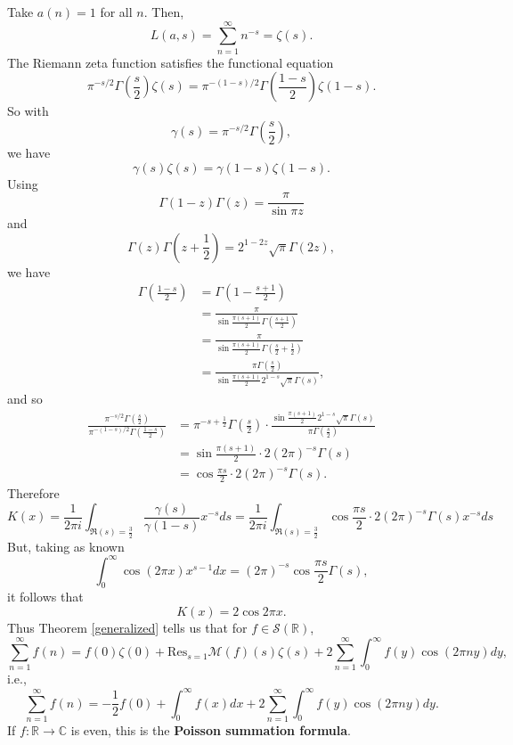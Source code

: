 \documentclass{article}
\newcommand{\Res}{\mathrm{Res}}
\theoremstyle{definition}
\begin{document}
Take $a(n)=1$ for all $n$. Then,
\[
L(a,s)=\sum_{n=1}^\infty n^{-s} = \zeta(s).
\]
The Riemann zeta function satisfies the functional equation
\[
\pi^{-s/2} \Gamma\left( \frac{s}{2} \right) \zeta(s)
=\pi^{-(1-s)/2} \Gamma\left( \frac{1-s}{2} \right) \zeta(1-s).
\]
So with
\[
\gamma(s) = \pi^{-s/2} \Gamma\left( \frac{s}{2} \right),
\]
we have
\[
\gamma(s) \zeta(s) = \gamma(1-s) \zeta(1-s).
\]
Using 
\[
\Gamma(1-z)\Gamma(z) = \frac{\pi}{\sin \pi z}
\]
and
\[
\Gamma(z)\Gamma\left(z+\frac{1}{2}\right) = 2^{1-2z} \sqrt{\pi} \Gamma(2z),
\]
we have
\begin{align*}
\Gamma\left(\frac{1-s}{2}\right)
&=\Gamma\left(1-\frac{s+1}{2}\right)\\
&=\frac{\pi}{\sin \frac{\pi(s+1)}{2} \Gamma\left(\frac{s+1}{2}\right)}\\
&=\frac{\pi}{\sin \frac{\pi(s+1)}{2} \Gamma\left(\frac{s}{2}+\frac{1}{2}\right)}\\
&=\frac{\pi \Gamma\left(\frac{s}{2}\right)}{\sin \frac{\pi(s+1)}{2} 2^{1-s}\sqrt{\pi} \Gamma(s)},
\end{align*}
and so
\begin{align*}
\frac{\pi^{-s/2} \Gamma\left( \frac{s}{2} \right)}{\pi^{-(1-s)/2} \Gamma\left( \frac{1-s}{2} \right)}&=
\pi^{-s+\frac{1}{2}} \Gamma\left( \frac{s}{2} \right) \cdot \frac{\sin \frac{\pi(s+1)}{2} 2^{1-s}\sqrt{\pi} \Gamma(s)}{\pi \Gamma\left(\frac{s}{2}\right)}\\
&=\sin \frac{\pi(s+1)}{2} \cdot 2 (2\pi)^{-s} \Gamma(s)\\
&=\cos \frac{\pi s}{2} \cdot 2 (2\pi)^{-s} \Gamma(s).
\end{align*}
Therefore
\[
K(x) = \frac{1}{2\pi i} \int_{\Re(s)=\frac{3}{2}} \frac{\gamma(s)}{\gamma(1-s)} x^{-s} ds
= \frac{1}{2\pi i} \int_{\Re(s)=\frac{3}{2}} \cos \frac{\pi s}{2} \cdot 2 (2\pi)^{-s} \Gamma(s) x^{-s} ds
\]
But, taking as known
\[
\int_0^\infty \cos(2\pi x) x^{s-1} dx = (2\pi)^{-s} \cos\frac{\pi s}{2} \Gamma(s),
\]
it follows that
\[
K(x) = 2 \cos 2\pi x.
\]
Thus Theorem \ref{generalized} tells us that for $f \in \mathscr{S}(\mathbb{R})$,
\[
\sum_{n=1}^\infty f(n) = f(0)\zeta(0) +\Res_{s=1} \mathscr{M}(f)(s) \zeta(s)
+ 2 \sum_{n=1}^\infty \int_0^\infty f(y) \cos(2\pi ny) dy,
\]
i.e.,
\[
\sum_{n=1}^\infty f(n) = -\frac{1}{2}f(0) + \int_0^\infty f(x) dx 
+ 2 \sum_{n=1}^\infty \int_0^\infty f(y) \cos(2\pi ny) dy.
\]
If $f:\mathbb{R} \to \mathbb{C}$ is even, this is the 
 \textbf{Poisson summation formula}.
\end{document}
